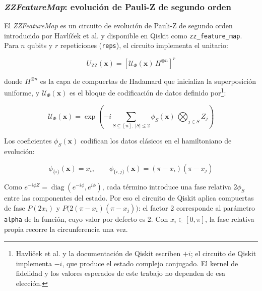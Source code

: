 
\subsubsection{\textit{ZZFeatureMap}: evolución de Pauli-Z de segundo orden}
\label{sec:zzfeaturemap}

El \textit{ZZFeatureMap} es un circuito de evolución de
Pauli-Z de segundo orden introducido por Havlíček et al.
\cite{havlicek2019supervised} y disponible en Qiskit como
\texttt{zz\_feature\_map}.
Para $n$ qubits y $r$ repeticiones (\texttt{reps}),
el circuito implementa el unitario:

\begin{equation}
  U_{\text{ZZ}}(\mathbf{x}) =
  \left[\mathcal{U}_\Phi(\mathbf{x})\,H^{\otimes n}
  \right]^r
  \label{eq:zzfeaturemap}
\end{equation}

\noindent donde $H^{\otimes n}$ es la capa de compuertas
de Hadamard que inicializa la superposición uniforme, y
$\mathcal{U}_\Phi(\mathbf{x})$ es el bloque de codificación
de datos definido por\footnote{Havlíček et al. y la documentación de Qiskit escriben $+i$; el circuito de Qiskit implementa $-i$, que produce el estado complejo conjugado. El kernel de fidelidad y los valores esperados de este trabajo no dependen de esa elección.}:

\begin{equation}
  \mathcal{U}_\Phi(\mathbf{x}) =
  \exp\!\left(-i \sum_{S \subseteq [n],\,|S|\leq 2}
  \phi_S(\mathbf{x})\,\bigotimes_{j \in S} Z_j\right)
  \label{eq:Uphi}
\end{equation}

\noindent Los coeficientes $\phi_S(\mathbf{x})$ codifican
los datos clásicos en el hamiltoniano de evolución:

\begin{equation}
  \phi_{\{i\}}(\mathbf{x}) = x_i, \qquad
  \phi_{\{i,j\}}(\mathbf{x}) =
  (\pi - x_i)(\pi - x_j)
  \label{eq:phi_coefficients}
\end{equation}

Como $e^{-i\phi Z} = \operatorname{diag}(e^{-i\phi}, e^{i\phi})$, cada término introduce una fase
relativa $2\phi_S$ entre las componentes del estado. Por eso el circuito de Qiskit aplica
compuertas de fase $P(2x_i)$ y $P\bigl(2(\pi-x_i)(\pi-x_j)\bigr)$: el factor 2 corresponde al
parámetro \texttt{alpha} de la función, cuyo valor por defecto es 2. Con $x_i\in[0,\pi]$, la fase
relativa propia recorre la circunferencia una vez.

